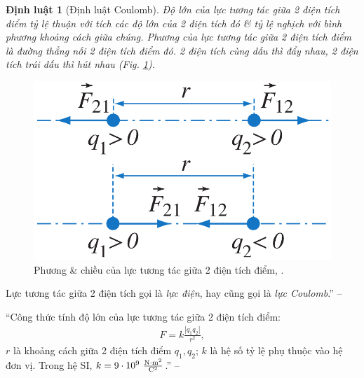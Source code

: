 \documentclass[oneside]{book}
\numberwithin{equation}{section}
\newtheorem{dinhluat}{Định luật}[section]
\begin{document}
\begin{dinhluat}[Định luật Coulomb]
	\label{dinh luat: Coulomb}
	Độ lớn của lực tương tác giữa 2 điện tích điểm tỷ lệ thuận với tích các độ lớn của 2 điện tích đó \& tỷ lệ nghịch với bình phương khoảng cách giữa chúng. Phương của lực tương tác giữa 2 điện tích điểm là đường thẳng nối 2 điện tích điểm đó. 2 điện tích cùng dấu thì đẩy nhau, 2 điện tích trái dấu thì hút nhau (Fig. \ref{fig:luc_tuong_tac_giua_2_dien_tich_diem}).
\end{dinhluat}

\begin{figure}[H]
	\centering
	\includegraphics[scale=0.15]{luc_tuong_tac_giua_2_dien_tich_diem}
	\caption{Phương \& chiều của lực tương tác giữa 2 điện tích điểm, \cite[Hình 1.6, p. 7]{SGK_Vat_Ly_11_nang_cao}.}
	\label{fig:luc_tuong_tac_giua_2_dien_tich_diem}
\end{figure}
Lực tương tác giữa 2 điện tích gọi là \textit{lực điện}, hay cũng gọi là \textit{lực Coulomb}.'' -- \cite[p. 7]{SGK_Vat_Ly_11_nang_cao}

``Công thức tính độ lớn của lực tương tác giữa 2 điện tích điểm:
\begin{align}
	\label{luc tuong tac giua 2 dien tich diem}
	F = k\frac{|q_1q_2|}{r^2},
\end{align}
$r$ là khoảng cách giữa 2 điện tích điểm $q_1,q_2$; $k$ là hệ số tỷ lệ phụ thuộc vào hệ đơn vị. Trong hệ SI, $k = 9\cdot 10^9\ \frac{\rm N\cdot m^2}{\rm C^2}$.'' -- \cite[p. 8]{SGK_Vat_Ly_11_nang_cao}
\end{document}
